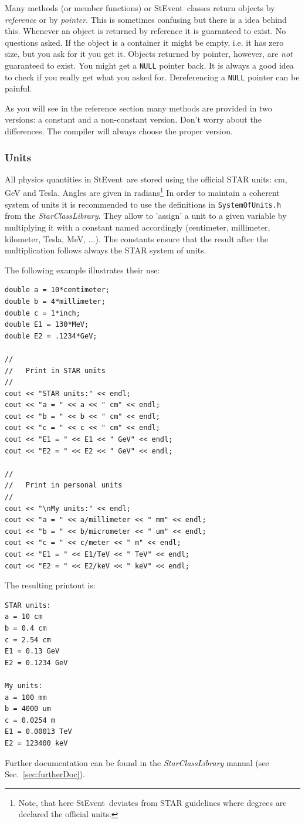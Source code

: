 \documentclass[twoside]{article}
\newcommand{\name}[1]{\textsl{#1}}%
\newcommand{\StEvent}{\textsf{StEvent}}
\begin{document}
Many methods (or member functions) or \StEvent\ classes return objects
by \emph{reference} or by \emph{pointer}. This is sometimes confusing
but there is a idea behind this. Whenever an object is returned by
reference it is guaranteed to exist. No questions asked. If the object
is a container it might be empty, i.e. it has zero size, but you ask
for it you get it. Objects returned by pointer, however, are
\emph{not} guaranteed to exist. You might get a \texttt{NULL} pointer
back.  It is always a good idea to check if you really get what you
asked for.  Dereferencing a \texttt{NULL} pointer can be painful.

As you will see in the reference section many methods are provided in
two versions: a constant and a non-constant version. Don't worry about
the differences. The compiler will always choose the proper version.

\subsubsection{Units}
\label{sec:units}
 

All physics quantities in \StEvent\ are stored using the official STAR
units: cm, GeV and Tesla.  Angles are given in radians\footnote{Note,
    that here \StEvent\ deviates from STAR guidelines where degrees
    are declared the official units.}  In order to maintain a coherent
system of units it is recommended to use the definitions in
\texttt{SystemOfUnits.h} from the \name{StarClassLibrary}. They allow
to 'assign' a unit to a given variable by multiplying it with a
constant named accordingly (centimeter, millimeter, kilometer, Tesla,
MeV, ...).  The constants ensure that the result after the
multiplication follows always the STAR system of units.

The following example illustrates their use:
\begin{verbatim}
double a = 10*centimeter;
double b = 4*millimeter;
double c = 1*inch;
double E1 = 130*MeV;
double E2 = .1234*GeV;

//
//   Print in STAR units
//
cout << "STAR units:" << endl;
cout << "a = " << a << " cm" << endl;
cout << "b = " << b << " cm" << endl;
cout << "c = " << c << " cm" << endl;
cout << "E1 = " << E1 << " GeV" << endl;
cout << "E2 = " << E2 << " GeV" << endl;

//
//   Print in personal units
//
cout << "\nMy units:" << endl;
cout << "a = " << a/millimeter << " mm" << endl;
cout << "b = " << b/micrometer << " um" << endl;
cout << "c = " << c/meter << " m" << endl;
cout << "E1 = " << E1/TeV << " TeV" << endl;
cout << "E2 = " << E2/keV << " keV" << endl;
\end{verbatim}
The resulting printout is:
\begin{verbatim}
STAR units:
a = 10 cm
b = 0.4 cm
c = 2.54 cm
E1 = 0.13 GeV
E2 = 0.1234 GeV

My units:
a = 100 mm
b = 4000 um
c = 0.0254 m
E1 = 0.00013 TeV
E2 = 123400 keV
\end{verbatim}
Further documentation can be found in the \name{StarClassLibrary}
manual (see Sec.~\ref{sec:furtherDoc}).\vfill
\end{document}
